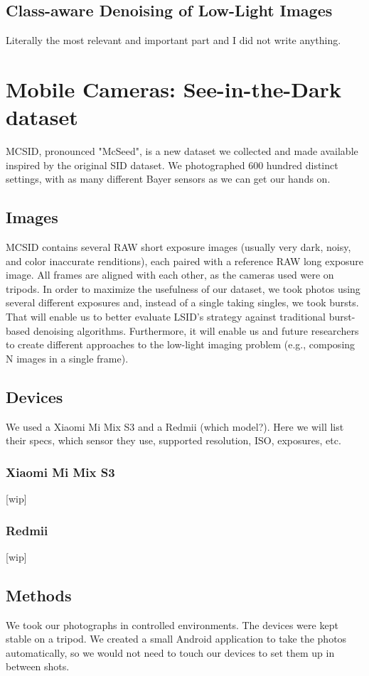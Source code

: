 \section{Class-aware Denoising of Low-Light Images}
Literally the most relevant and important part and I did not write anything.


\chapter{\label{chap:dataset}Mobile Cameras: See-in-the-Dark dataset}
MCSID, pronounced "McSeed", is a new dataset we collected and made available inspired by the original SID dataset.
We photographed 600 hundred distinct settings, with as many different Bayer sensors as we can get our hands on.

\section{Images}
MCSID contains several RAW short exposure images (usually very dark, noisy, and color inaccurate renditions), each paired with a reference RAW long exposure image.
All frames are aligned with each other, as the cameras used were on tripods.
In order to maximize the usefulness of our dataset, we took photos using several different exposures and, instead of a single taking singles, we took bursts.
That will enable us to better evaluate LSID's strategy against traditional burst-based denoising algorithms.
Furthermore, it will enable us and future researchers to create different approaches to the low-light imaging problem (e.g., composing N images in a single frame).

\section{Devices}
We used a Xiaomi Mi Mix S3 and a Redmii (which model?).
Here we will list their specs, which sensor they use, supported resolution, ISO, exposures, etc.

\subsection{Xiaomi Mi Mix S3}
[wip]

\subsection{Redmii}
[wip]

\section{Methods}
We took our photographs in controlled environments.
The devices were kept stable on a tripod.
We created a small Android application to take the photos automatically, so we would not need to touch our devices to set them up in between shots.


